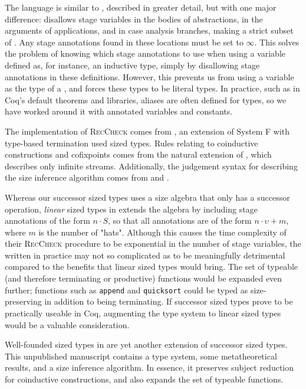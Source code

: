 \documentclass[sigplan,10pt,anonymous,review]{acmart}
\begin{document}
The language \CIChatbar \cite{cic-hat-bar} is similar to \CIChat, described in greater detail, but with one major difference: \CIChatbar disallows stage variables in the bodies of abstractions, in the arguments of applications, and in case analysis branches, making \CIChatbar a strict subset of \CIChat. Any stage annotations found in these locations must be set to $\infty$. This solves the problem of knowing which stage annotations to use when using a variable defined as, for instance, an inductive type, simply by disallowing stage annotations in these definitions. However, this prevents us from using a variable as the \corecursive type of a \cofixpoint, and forces these types to be literal \coinductive types. In practice, such as in Coq's default theorems and libraries, aliases are often defined for \coinductive types, so we have worked around it with annotated variables and constants.

The implementation of \textsc{RecCheck} comes from \Fhat \cite{f-hat}, an extension of System F with type-based termination used sized types. Rules relating to coinductive constructions and cofixpoints comes from the natural extension of \CChatomega \cite{cc-hat-omega}, which describes only infinite streams. Additionally, the judgement syntax for describing the size inference algorithm comes from \CChatomega and \CIChatl \cite{cic-hat-l}.

Whereas our successor sized types uses a size algebra that only has a successor operation, \textit{linear} sized types in \CIChatl extends the algebra by including stage annotations of the form $n \cdot S$, so that all annotations are of the form $n \cdot \upsilon + m$, where $m$ is the number of "hats". Although this causes the time complexity of their \textsc{RecCheck} procedure to be exponential in the number of stage variables, the \cofixpoints written in practice may not so complicated as to be meaningfully detrimental compared to the benefits that linear sized types would bring. The set of typeable (and therefore terminating or productive) functions would be expanded even further; functions such as \texttt{append} and \texttt{quicksort} could be typed as size-preserving in addition to being terminating. If successor sized types prove to be practically useable in Coq, augmenting the type system to linear sized types would be a valuable consideration.

Well-founded sized types in \CIChatsub \cite{wellfounded} are yet another extension of successor sized types. This unpublished manuscript contains a type system, some metatheoretical results, and a size inference algorithm. In essence, it preserves subject reduction for coinductive constructions, and also expands the set of typeable functions.
\end{document}
